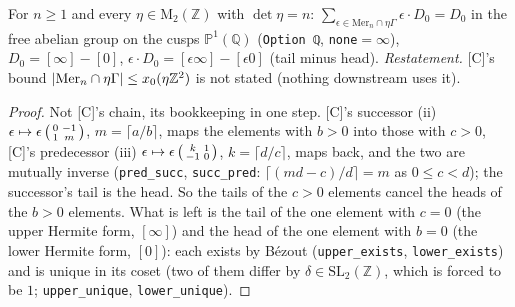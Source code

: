 \begin{lemma}\label{lem:merelpath-model}
  \leanok
  For $n\ge1$ and every $\eta\in\mathrm M_2(\mathbb Z)$ with $\det\eta=n$: $\sum_{\epsilon\in\mathrm{Mer}_n\cap\eta\Gamma}\epsilon\cdot D_0=D_0$ in the
  free abelian group on the cusps $\mathbb P^1(\mathbb Q)$ (\texttt{Option ℚ}, \texttt{none}${}=\infty$), $D_0=[\infty]-[0]$,
  $\epsilon\cdot D_0=[\epsilon\infty]-[\epsilon0]$ (tail minus head).
  \emph{Restatement.} [C]'s bound $\lvert\mathrm{Mer}_n\cap\eta\Gamma\rvert\le x_0(\eta\mathbb Z^2)$ is not stated (nothing downstream uses it).
\end{lemma}
\begin{proof}
  \leanok
  Not [C]'s chain, its bookkeeping in one step. [C]'s successor (ii) $\epsilon\mapsto\epsilon\left(\begin{smallmatrix}0&-1\\1&m\end{smallmatrix}\right)$, $m=\lceil a/b\rceil$, maps the
  elements with $b>0$ into those with $c>0$, [C]'s predecessor (iii) $\epsilon\mapsto\epsilon\left(\begin{smallmatrix}k&1\\-1&0\end{smallmatrix}\right)$, $k=\lceil d/c\rceil$, maps
  back, and the two are mutually inverse (\texttt{pred\_succ}, \texttt{succ\_pred}: $\lceil(md-c)/d\rceil=m$ as $0\le c<d$); the
  successor's tail is the head. So the tails of the $c>0$ elements cancel the heads of the $b>0$ elements. What is left is the tail of
  the one element with $c=0$ (the upper Hermite form, $[\infty]$) and the head of the one element with $b=0$ (the lower Hermite form,
  $[0]$): each exists by Bézout (\texttt{upper\_exists}, \texttt{lower\_exists}) and is unique in its coset (two of them differ by
  $\delta\in\mathrm{SL}_2(\mathbb Z)$, which is forced to be $1$; \texttt{upper\_unique}, \texttt{lower\_unique}).
\end{proof}

